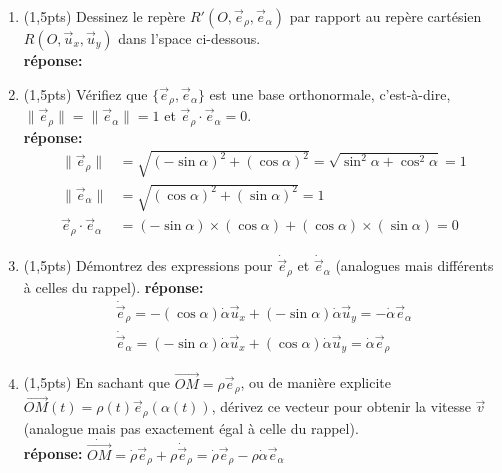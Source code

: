\documentclass[french,10pt]{article}
\begin{document}
		\begin{enumerate}
			\item (1,5pts) Dessinez le repère $R'(O, \vec{e}_{\rho}, \vec{e}_\alpha)$ par rapport au repère cartésien $R(O, \vec{u}_x, \vec{u}_y)$ dans l'space ci-dessous. \\
			\textbf{réponse:} \\
		
			\item (1,5pts) Vérifiez que $\{ \vec{e}_{\rho}, \vec{e}_\alpha\}$ est une base orthonormale, c'est-à-dire, $\|\vec{e}_{\rho}\| = \|\vec{e}_{\alpha}\| = 1$ et $\vec{e}_{\rho} \cdot \vec{e}_{\alpha} = 0$. \\
			\textbf{réponse:} 
			\begin{align*}
			\| \vec{e}_{\rho} \| &= \sqrt{(-\sin \alpha)^2 + (\cos \alpha)^2} = \sqrt{\sin^2 \alpha + \cos^2 \alpha} = 1 \\ 
			\| \vec{e}_{\alpha} \| &= \sqrt{(\cos \alpha)^2 + (\sin \alpha)^2} = 1 \\ 
			\vec{e}_{\rho} \cdot \vec{e}_{\alpha} &= (-\sin \alpha) \times (\cos \alpha) + (\cos \alpha) \times (\sin \alpha) = 0
			\end{align*}
			\item (1,5pts) Démontrez des expressions pour $\dot{\vec{e}}_{\rho}$ et $\dot{\vec{e}}_{\alpha}$ (analogues mais différents à celles du rappel).
			\textbf{réponse:} 
			\begin{align*}
				\dot{\vec{e}}_{\rho}= - (\cos \alpha) \dot{\alpha} \vec{u}_x + (-\sin \alpha) \dot{\alpha} \vec{u}_y = \boxed{ -\dot{\alpha} \vec{e}_{\alpha}} \\
				\dot{\vec{e}}_{\alpha}= (-\sin \alpha) \dot{\alpha} \vec{u}_x + (\cos \alpha) \dot{\alpha} \vec{u}_y = \boxed{ \dot{\alpha} \vec{e}_{\rho}}
			\end{align*}
			\item (1,5pts) En sachant que $\vec{OM} = \rho \vec{e}_\rho$, ou de manière explicite $\vec{OM}(t) = \rho(t) \vec{e}_\rho(\alpha(t))$, dérivez ce vecteur pour obtenir la vitesse $\vec{v}$ (analogue mais pas exactement égal à celle du rappel). \\
			\textbf{réponse:} $\dot{\vec{OM}} = \dot{\rho} \vec{e}_\rho + \rho \dot{\vec{e}}_{\rho} = \boxed{\dot{\rho} \vec{e}_\rho - \rho \dot{\alpha} \vec{e}_{\alpha}}$ 
		\end{enumerate}
\end{document}
